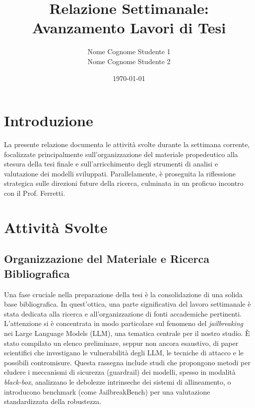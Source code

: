 \documentclass[11pt, a4paper]{article}
\title{Relazione Settimanale: Avanzamento Lavori di Tesi}
\author{Nome Cognome Studente 1 \\ Nome Cognome Studente 2} %
\date{\today}
\begin{document}
\maketitle
\thispagestyle{empty}
\clearpage

\tableofcontents
\clearpage
{}

\section{Introduzione}
La presente relazione documenta le attività svolte durante la settimana corrente, focalizzate principalmente sull'organizzazione del materiale propedeutico alla stesura della tesi finale e sull'arricchimento degli strumenti di analisi e valutazione dei modelli sviluppati. Parallelamente, è proseguita la riflessione strategica sulle direzioni future della ricerca, culminata in un proficuo incontro con il Prof. Ferretti.

\section{Attività Svolte}

\subsection{Organizzazione del Materiale e Ricerca Bibliografica}
Una fase cruciale nella preparazione della tesi è la consolidazione di una solida base bibliografica. In quest'ottica, una parte significativa del lavoro settimanale è stata dedicata alla ricerca e all'organizzazione di fonti accademiche pertinenti. L'attenzione si è concentrata in modo particolare sul fenomeno del \textit{jailbreaking} nei Large Language Models (LLM), una tematica centrale per il nostro studio.
È stato compilato un elenco preliminare, seppur non ancora esaustivo, di paper scientifici che investigano le vulnerabilità degli LLM, le tecniche di attacco e le possibili contromisure. Questa rassegna include studi che propongono metodi per eludere i meccanismi di sicurezza (guardrail) dei modelli, spesso in modalità \textit{black-box}, analizzano le debolezze intrinseche dei sistemi di allineamento, o introducono benchmark (come JailbreakBench) per una valutazione standardizzata della robustezza.
\end{document}
